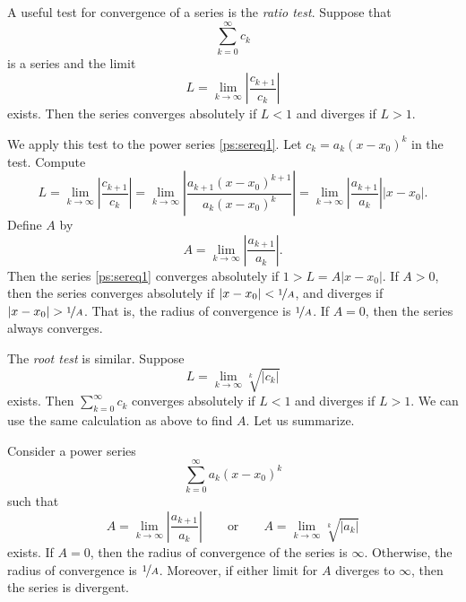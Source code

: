 A useful test for convergence of a series is the
\emph{ratio test}.  Suppose that
\begin{equation*}
\sum_{k=0}^\infty c_k
\end{equation*}
is a series and the limit
\begin{equation*}
L = \lim_{k\to\infty} \left \lvert \frac{c_{k+1}}{c_k} \right \rvert
\end{equation*}
exists.  Then the series converges absolutely if $L < 1$ and diverges
if $L > 1$.

We apply this test to the power series \eqref{ps:sereq1}. 
Let $c_k = a_k {(x - x_0)}^k$ in the test.  Compute
\begin{equation*}
L = \lim_{k\to\infty} \left \lvert \frac{c_{k+1}}{c_k} \right \rvert
=
\lim_{k\to\infty} \left \lvert
\frac{a_{k+1} {(x - x_0)}^{k+1}}{a_k {(x - x_0)}^k}
\right \rvert
=
\lim_{k\to\infty} \left \lvert
\frac{a_{k+1}}{a_k}
\right \rvert
\lvert  x - x_0 \rvert .
\end{equation*}
Define $A$ by
\begin{equation*}
A =
\lim_{k\to\infty} \left \lvert
\frac{a_{k+1}}{a_k}
\right \rvert .
\end{equation*}
Then the series \eqref{ps:sereq1}
converges absolutely if $1 > L = A \lvert x - x_0 \rvert$.
If $A > 0$, then
the series converges absolutely
if $\lvert x - x_0 \rvert < \nicefrac{1}{A}$,
and diverges if $\lvert x - x_0 \rvert > \nicefrac{1}{A}$.  That is,
the radius of convergence is $\nicefrac{1}{A}$.
If $A = 0$, then the series always converges.

The \emph{root test} is similar.
Suppose
\begin{equation*}
L = \lim_{k\to\infty} \sqrt[k]{\lvert c_k \rvert}
\end{equation*}
exists.  Then $\sum_{k=0}^\infty c_k$ converges absolutely if $L < 1$
and diverges if $L > 1$.  We can use the same calculation as above
to find $A$.
Let us summarize.

\begin{theorem}
Consider a power series
\begin{equation*}
\sum_{k=0}^\infty a_k {(x-x_0)}^k
\end{equation*}
such that
\begin{equation*}
A =
\lim_{k\to\infty}
\left \lvert
\frac{a_{k+1}}{a_k}
\right \rvert
\qquad \text{or} \qquad
A =
\lim_{k\to\infty} \sqrt[k]{\lvert a_k \rvert}
\end{equation*}
exists.  If $A = 0$, then the radius of convergence of the series
is $\infty$.  Otherwise, the radius of convergence is $\nicefrac{1}{A}$.
Moreover, if either limit for 
$A$ diverges to $\infty$, then the series is divergent.
\pagebreak[3]
\end{theorem}

